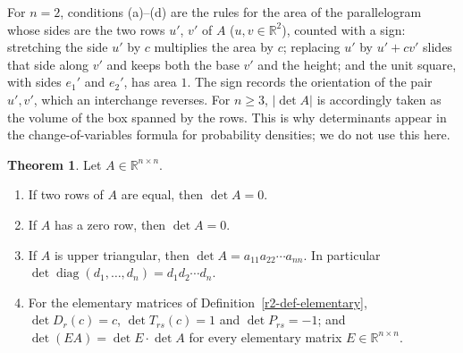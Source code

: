 \documentclass[12pt]{article}
\newcommand{\R}{\mathbb R}
\DeclareMathOperator{\diag}{diag}
\theoremstyle{definition}
\newtheorem{theorem}{Theorem}
\begin{document}
For \(n=2\), conditions (a)--(d) are the rules for the area of the parallelogram whose sides are the two rows
\(u'\), \(v'\) of \(A\) (\(u,v\in\R^2\)), counted with a sign: stretching the side \(u'\) by \(c\) multiplies the area
by \(c\); replacing \(u'\) by \(u'+cv'\) slides that side along \(v'\) and keeps both the base \(v'\) and the height;
and the unit square, with sides \(e_1'\) and \(e_2'\), has area \(1\). The sign records the orientation of the pair
\(u',v'\), which an interchange reverses. For \(n\geqslant3\), \(\lvert\det A\rvert\) is accordingly taken as the volume of
the box spanned by the rows. This is why determinants appear in the change-of-variables formula for probability
densities; we do not use this here.

\begin{theorem}\label{r5d-thm-basic}
Let \(A\in\R^{n\times n}\).
\begin{enumerate}
\item If two rows of \(A\) are equal, then \(\det A=0\).
\item If \(A\) has a zero row, then \(\det A=0\).
\item If \(A\) is upper triangular, then \(\det A=a_{11}a_{22}\cdots a_{nn}\). In particular
\(\det\diag(d_1,\dots,d_n)=d_1d_2\cdots d_n\).
\item For the elementary matrices of Definition~\ref{r2-def-elementary}, \(\det D_r(c)=c\),
\(\det T_{rs}(c)=1\) and \(\det P_{rs}=-1\); and \(\det(EA)=\det E\cdot\det A\) for every elementary matrix
\(E\in\R^{n\times n}\).
\end{enumerate}
\end{theorem}
\end{document}
